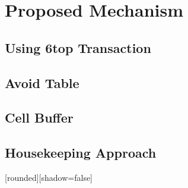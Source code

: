 \section{Proposed Mechanism}

\subsection{Using 6top Transaction}
\subsection{Avoid Table}
\subsection{Cell Buffer}
\subsection{Housekeeping Approach}

\begin{withoutheadline}
\begin{frame}


[rounded][shadow=false]



\end{frame}
\end{withoutheadline}
